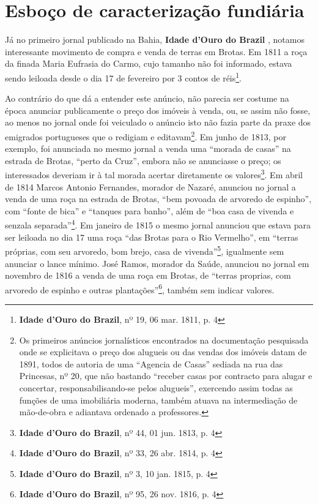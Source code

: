 \section{Esboço de caracterização fundiária}\label{sec:2.3}

Já no primeiro jornal publicado na Bahia, \textbf{Idade d'Ouro do Brazil} \cite[p.~162]{souza_imprensa_1972}, notamos interessante movimento de compra e venda de terras em Brotas. Em 1811 a roça da finada Maria Eufrasia do Carmo, cujo tamanho não foi informado, estava sendo leiloada desde o dia 17 de fevereiro por 3 contos de réis\footnote{\textbf{Idade d'Ouro do Brazil}, nº 19, 06 mar. 1811, p. 4}.

Ao contrário do que dá a entender este anúncio, não parecia ser costume na época anunciar publicamente o preço dos imóveis à venda, ou, se assim não fosse, ao menos no jornal onde foi veiculado o anúncio isto não fazia parte da praxe dos emigrados portugueses que o redigiam e editavam\footnote{Os primeiros anúncios jornalísticos encontrados na documentação pesquisada onde se explicitava o preço dos alugueis ou das vendas dos imóveis datam de 1891, todos de autoria de uma ``Agencia de Casas'' sediada na rua das Princesas, nº 20, que não bastando ``receber casas por contracto para alugar e concertar, responsabilisando-se pelos alugueis'', exercendo assim todas as funções de uma imobiliária moderna, também atuava na intermediação de mão-de-obra e adiantava ordenado a professores.}. Em junho de 1813, por exemplo, foi anunciada no mesmo jornal a venda uma ``morada de casas'' na estrada de Brotas, ``perto da Cruz'', embora não se anunciasse o preço; os interessados deveriam ir à tal morada acertar diretamente os valores\footnote{\textbf{Idade d'Ouro do Brazil}, nº 44, 01 jun. 1813, p. 4}. Em abril de 1814 Marcos Antonio Fernandes, morador de Nazaré, anunciou no jornal a venda de uma roça na estrada de Brotas, ``bem povoada de arvoredo de espinho'', com ``fonte de bica'' e ``tanques para banho'', além de ``boa casa de vivenda e senzala separada''\footnote{\textbf{Idade d'Ouro do Brazil}, nº 33, 26 abr. 1814, p. 4}. Em janeiro de 1815 o mesmo jornal anunciou que estava para ser leiloada no dia 17 uma roça ``das Brotas para o Rio Vermelho'', em ``terras próprias, com seu arvoredo, bom brejo, casa de vivenda''\footnote{\textbf{Idade d'Ouro do Brazil}, nº 3, 10 jan. 1815, p. 4}, igualmente sem anunciar o lance mínimo. José Ramos, morador da Saúde, anunciou no jornal em novembro de 1816 a venda de uma roça em Brotas, de ``terras proprias, com arvoredo de espinho e outras plantações''\footnote{\textbf{Idade d'Ouro do Brazil}, nº 95, 26 nov. 1816, p. 4}, também sem indicar valores. 

